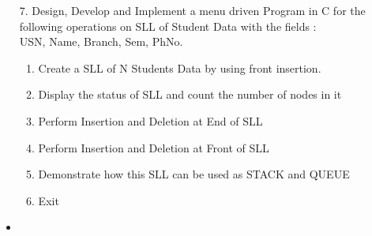 \documentclass{article}
\newcommand{\answer}{\item [$\rightarrow$]}
\begin{document}
	\begin{itemize}
		\item [7.] Design, Develop and Implement a menu driven Program in C for the following operations on SLL of Student Data with the fields : \\ USN, Name, Branch, Sem, PhNo.
		\begin{enumerate}[label=\alph*.]
			\item Create a SLL of N Students Data by using front insertion.
			\item Display the status of SLL and count the number of nodes in it
			\item Perform Insertion and Deletion at End of SLL
			\item Perform Insertion and Deletion at Front of SLL
			\item Demonstrate how this SLL can be used as STACK and QUEUE
			\item Exit
		\end{enumerate}
		\answer \inputminted{c}{../../Program7.c}
	\end{itemize}
\end{document}
